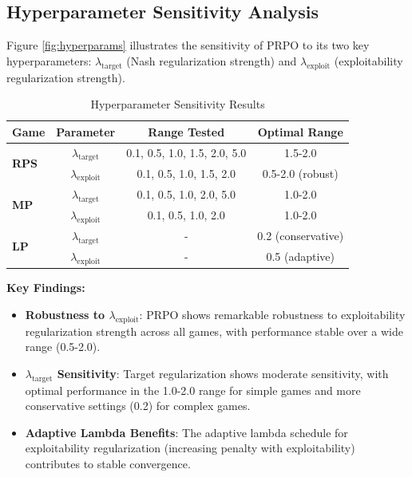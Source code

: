 \documentclass[sigconf,anonymous]{aamas}
\begin{document}
\subsection{Hyperparameter Sensitivity Analysis}

Figure \ref{fig:hyperparams} illustrates the sensitivity of PRPO to its two key hyperparameters: \(\lambda_{\text{target}}\) (Nash regularization strength) and \(\lambda_{\text{exploit}}\) (exploitability regularization strength).

\begin{table}[h]
\centering
\caption{Hyperparameter Sensitivity Results}
\label{tab:hyperparams}
\begin{tabular}{@{}lccc@{}}
\toprule
\textbf{Game} & \textbf{Parameter} & \textbf{Range Tested} & \textbf{Optimal Range} \\
\midrule
\multirow{2}{*}{\textbf{RPS}}
& \(\lambda_{\text{target}}\) & 0.1, 0.5, 1.0, 1.5, 2.0, 5.0 & 1.5-2.0 \\
& \(\lambda_{\text{exploit}}\) & 0.1, 0.5, 1.0, 1.5, 2.0 & 0.5-2.0 (robust) \\
\midrule
\multirow{2}{*}{\textbf{MP}}
& \(\lambda_{\text{target}}\) & 0.1, 0.5, 1.0, 2.0, 5.0 & 1.0-2.0 \\
& \(\lambda_{\text{exploit}}\) & 0.1, 0.5, 1.0, 2.0 & 1.0-2.0 \\
\midrule
\multirow{2}{*}{\textbf{LP}}
& \(\lambda_{\text{target}}\) & - & 0.2 (conservative) \\
& \(\lambda_{\text{exploit}}\) & - & 0.5 (adaptive) \\
\bottomrule
\end{tabular}
\end{table}

\textbf{Key Findings:}
\begin{itemize}
\item \textbf{Robustness to \(\lambda_{\text{exploit}}\)}: PRPO shows remarkable robustness to exploitability regularization strength across all games, with performance stable over a wide range (0.5-2.0).
\item \textbf{\(\lambda_{\text{target}}\) Sensitivity}: Target regularization shows moderate sensitivity, with optimal performance in the 1.0-2.0 range for simple games and more conservative settings (0.2) for complex games.
\item \textbf{Adaptive Lambda Benefits}: The adaptive lambda schedule for exploitability regularization (increasing penalty with exploitability) contributes to stable convergence.
\end{itemize}
\end{document}
